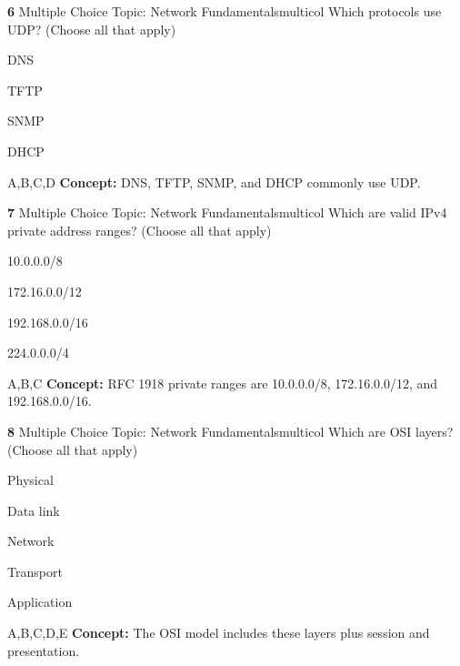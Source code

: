 \documentclass[10pt,a4paper]{article}
\begin{document}
\begin{qcard}{\color{white}\textbf{6} \hfill \small Multiple Choice \textbar{} Topic: Network Fundamentals}{multicol}
Which protocols use UDP? (Choose all that apply)

\begin{qoptions}
\item DNS
\item TFTP
\item SNMP
\item DHCP
\end{qoptions}
\begin{explainbox}{A,B,C,D}
\textbf{Concept:} DNS, TFTP, SNMP, and DHCP commonly use UDP.
\end{explainbox}
\end{qcard}

\begin{qcard}{\color{white}\textbf{7} \hfill \small Multiple Choice \textbar{} Topic: Network Fundamentals}{multicol}
Which are valid IPv4 private address ranges? (Choose all that apply)

\begin{qoptions}
\item 10.0.0.0/8
\item 172.16.0.0/12
\item 192.168.0.0/16
\item 224.0.0.0/4
\end{qoptions}
\begin{explainbox}{A,B,C}
\textbf{Concept:} RFC 1918 private ranges are 10.0.0.0/8, 172.16.0.0/12, and 192.168.0.0/16.
\end{explainbox}
\end{qcard}

\begin{qcard}{\color{white}\textbf{8} \hfill \small Multiple Choice \textbar{} Topic: Network Fundamentals}{multicol}
Which are OSI layers? (Choose all that apply)

\begin{qoptions}
\item Physical
\item Data link
\item Network
\item Transport
\item Application
\end{qoptions}
\begin{explainbox}{A,B,C,D,E}
\textbf{Concept:} The OSI model includes these layers plus session and presentation.
\end{explainbox}
\end{qcard}
\end{document}
